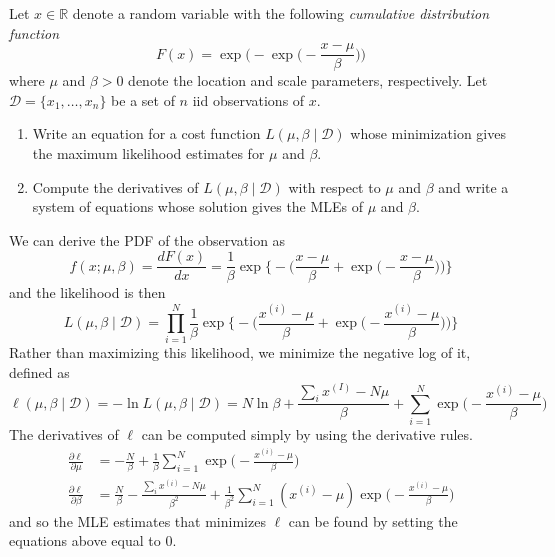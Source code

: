   \begin{exercise}
    Let $x \in \mathbb{R}$ denote a random variable with the following \textit{cumulative distribution function} 
    \begin{equation}
      F(x) = \exp \bigg( - \exp \bigg( - \frac{x - \mu}{\beta} \bigg) \bigg)
    \end{equation}
    where $\mu$ and $\beta > 0$ denote the location and scale parameters, respectively. Let $\mathcal{D} = \{x_1, \ldots, x_n\}$ be a set of $n$ iid observations of $x$. 
    \begin{enumerate}
      \item Write an equation for a cost function $L(\mu, \beta \mid \mathcal{D})$ whose minimization gives the maximum likelihood estimates for $\mu$ and $\beta$. 
      \item Compute the derivatives of $L(\mu, \beta \mid \mathcal{D})$ with respect to $\mu$ and $\beta$ and write a system of equations whose solution gives the MLEs of $\mu$ and $\beta$. 
    \end{enumerate}
  \end{exercise}
  \begin{solution}
    We can derive the PDF of the observation as 
    \begin{equation}
      f(x; \mu, \beta) = \frac{d F(x)}{dx} = \frac{1}{\beta} \exp \bigg\{ - \bigg( \frac{x - \mu}{\beta} + \exp \Big( - \frac{x - \mu}{\beta}\Big) \bigg) \bigg\}
    \end{equation}
    and the likelihood is then 
    \begin{equation}
      L(\mu, \beta \mid \mathcal{D}) = \prod_{i=1}^N \frac{1}{\beta} \exp \bigg\{ - \bigg( \frac{x^{(i)} - \mu}{\beta} + \exp \Big( - \frac{x^{(i)} - \mu}{\beta}\Big) \bigg) \bigg\}
    \end{equation}
    Rather than maximizing this likelihood, we minimize the negative log of it, defined as 
    \begin{equation}
      \ell(\mu, \beta \mid \mathcal{D}) = - \ln L(\mu, \beta \mid \mathcal{D}) = N \ln{\beta} + \frac{\sum_{i} x^{(I)} - N \mu}{\beta} + \sum_{i=1}^N \exp \Big( - \frac{x^{(i)} - \mu}{\beta} \Big)
    \end{equation}
    The derivatives of $\ell$ can be computed simply by using the derivative rules.  
    \begin{align}
      \frac{\partial \ell}{\partial \mu} & = - \frac{N}{\beta} + \frac{1}{\beta} \sum_{i=1}^N \exp \Big( - \frac{x^{(i)} - \mu}{\beta} \Big) \\
      \frac{\partial \ell}{\partial \beta} & = \frac{N}{\beta} - \frac{\sum_{i} x^{(i)} - N \mu}{\beta^2} + \frac{1}{\beta^2} \sum_{i=1}^N (x^{(i)} - \mu) \exp \Big( - \frac{x^{(i)} - \mu}{\beta} \Big)
    \end{align}
    and so the MLE estimates that minimizes $\ell$ can be found by setting the equations above equal to $0$. 
  \end{solution}

